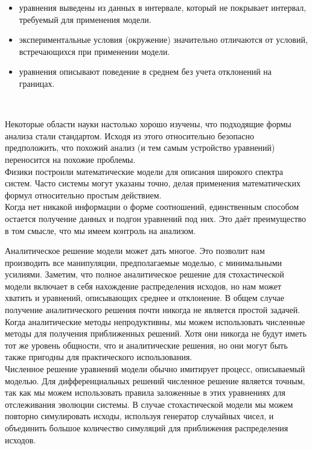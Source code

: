 \begin{itemize}
  \item уравнения выведены из данных в интервале, который не покрывает интервал, требуемый для применения модели.
  \item экспериментальные условия (окружение) значительно отличаются от условий, встречающихся при применении модели.
  \item уравнения описывают поведение в среднем без учета отклонений на границах.
\end{itemize}
\

Некоторые области науки настолько хорошо изучены, что подходящие формы анализа стали стандартом. Исходя из этого относительно безопасно предположить, что похожий анализ (и тем самым устройство уравнений) переносится на похожие проблемы. \\

Физики построили математические модели для описания широкого спектра систем. Часто системы могут указаны точно, делая применения математических формул относительно простым действием. \\

Когда нет никакой информации о форме соотношений, единственным способом остается получение данных и подгон уравнений под них. Это даёт преимущество в том смысле, что мы имеем контроль на анализом. \\



Аналитическое решение модели может дать многое. Это позволит нам производить все манипуляции, предполагаемые моделью, с минимальными усилиями. Заметим, что полное аналитическое решение для стохастической модели включает в себя нахождение распределения исходов, но нам может хватить и уравнений, описывающих среднее и отклонение. В общем случае получение аналитического решения почти никогда не является простой задачей. \\

Когда аналитические методы непродуктивны, мы можем использовать численные методы для получения приближенных решений. Хотя они никогда не будут иметь тот же уровень общности, что и аналитические решения, но они могут быть также пригодны для практического использования. \\

Численное решение уравнений модели обычно имитирует процесс, описываемый моделью. Для дифференциальных решений численное решение является точным, так как мы можем использовать правила заложенные в этих уравнениях для отслеживания эволюции системы. В случае стохастической модели мы можем повторно симулировать исходы, используя генератор случайных чисел, и объединить большое количество симуляций для приближения распределения исходов. 


